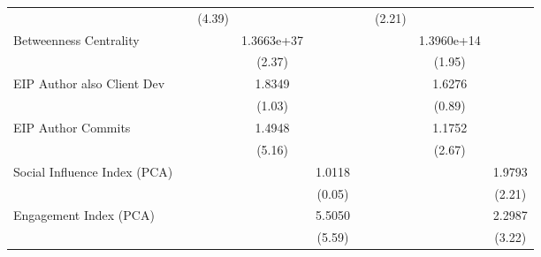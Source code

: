 {\begin{tabular}{l*{8}{c}}
                                   &                     &      (4.39)         &                     &                     &                     &      (2.21)         &                     &                     \\
[1em]
Betweenness Centrality             &                     &                     &  1.3663e+37\sym{**} &                     &                     &                     &  1.3960e+14\sym{*}  &                     \\
                                   &                     &                     &      (2.37)         &                     &                     &                     &      (1.95)         &                     \\
[1em]
EIP Author also Client Dev         &                     &                     &      1.8349         &                     &                     &                     &      1.6276         &                     \\
                                   &                     &                     &      (1.03)         &                     &                     &                     &      (0.89)         &                     \\
[1em]
EIP Author Commits                 &                     &                     &      1.4948\sym{***}&                     &                     &                     &      1.1752\sym{***}&                     \\
                                   &                     &                     &      (5.16)         &                     &                     &                     &      (2.67)         &                     \\
[1em]
Social Influence Index (PCA)       &                     &                     &                     &      1.0118         &                     &                     &                     &      1.9793\sym{**} \\
                                   &                     &                     &                     &      (0.05)         &                     &                     &                     &      (2.21)         \\
[1em]
Engagement Index (PCA)             &                     &                     &                     &      5.5050\sym{***}&                     &                     &                     &      2.2987\sym{***}\\
                                   &                     &                     &                     &      (5.59)         &                     &                     &                     &      (3.22)         \\

\end{tabular}}
